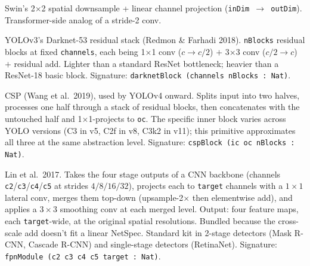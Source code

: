 \begin{definition}
  \label{layer:patchMerging}
  \leanok
  Swin's 2$\times$2 spatial downsample + linear channel projection
  (\texttt{inDim $\to$ outDim}). Transformer-side analog of a stride-2
  conv.
\end{definition}

\begin{definition}
  \label{layer:darknetBlock}
  \leanok
  YOLOv3's Darknet-53 residual stack (Redmon \& Farhadi 2018).
  \texttt{nBlocks} residual blocks at fixed \texttt{channels}, each
  being 1$\times$1 conv ($c \to c/2$) $+$ 3$\times$3 conv ($c/2 \to c$)
  $+$ residual add. Lighter than a standard ResNet bottleneck; heavier
  than a ResNet-18 basic block. Signature:
  \texttt{darknetBlock (channels nBlocks : Nat)}.
\end{definition}

\begin{definition}
  \label{layer:cspBlock}
  \leanok
  CSP (Wang et al.\ 2019), used by YOLOv4 onward. Splits input into two
  halves, processes one half through a stack of residual blocks, then
  concatenates with the untouched half and 1$\times$1-projects to
  \texttt{oc}. The specific inner block varies across YOLO versions (C3
  in v5, C2f in v8, C3k2 in v11); this primitive approximates all three
  at the same abstraction level. Signature:
  \texttt{cspBlock (ic oc nBlocks : Nat)}.
\end{definition}

\begin{definition}
  \label{layer:fpnModule}
  \leanok
  Lin et al.\ 2017. Takes the four stage outputs of a CNN backbone
  (channels \texttt{c2}/\texttt{c3}/\texttt{c4}/\texttt{c5} at strides
  $4/8/16/32$), projects each to \texttt{target} channels with a
  $1\times 1$ lateral conv, merges them top-down (upsample-2$\times$
  then elementwise add), and applies a $3\times 3$ smoothing conv at
  each merged level. Output: four feature maps, each
  \texttt{target}-wide, at the original spatial resolutions. Bundled
  because the cross-scale add doesn't fit a linear NetSpec. Standard
  kit in 2-stage detectors (Mask R-CNN, Cascade R-CNN) and
  single-stage detectors (RetinaNet). Signature:
  \texttt{fpnModule (c2 c3 c4 c5 target : Nat)}.
\end{definition}

